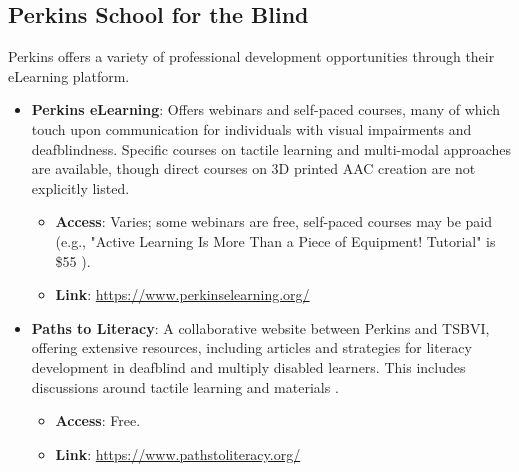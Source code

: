 \subsection{Perkins School for the Blind}
Perkins offers a variety of professional development opportunities through their eLearning platform.
\begin{itemize}
    \item \textbf{Perkins eLearning}: Offers webinars and self-paced courses, many of which touch upon communication for individuals with visual impairments and deafblindness. Specific courses on tactile learning and multi-modal approaches are available, though direct courses on 3D printed AAC creation are not explicitly listed.
    \begin{itemize}
        \item \textbf{Access}: Varies; some webinars are free, self-paced courses may be paid (e.g., "Active Learning Is More Than a Piece of Equipment! Tutorial" is \$55  \cite{NCDB_Perkins}).
        \item \textbf{Link}: \url{https://www.perkinselearning.org/}
    \end{itemize}
    \item \textbf{Paths to Literacy}: A collaborative website between Perkins and TSBVI, offering extensive resources, including articles and strategies for literacy development in deafblind and multiply disabled learners. This includes discussions around tactile learning and materials  \cite{PathsToLiteracy}.
    \begin{itemize}
        \item \textbf{Access}: Free.
        \item \textbf{Link}: \url{https://www.pathstoliteracy.org/}
    \end{itemize}
\end{itemize}

